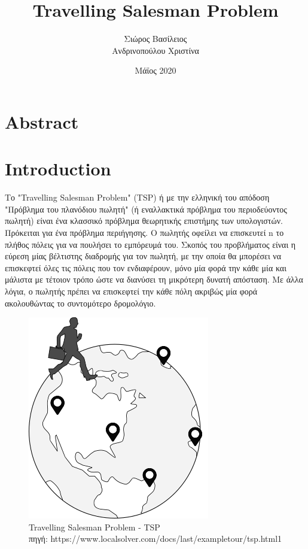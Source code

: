 \documentclass[oneside,12pt]{book}
\title{\huge Travelling Salesman Problem}
\author{Σιώρος Βασίλειος\\Ανδρινοπούλου Χριστίνα}
\date{Μάϊος 2020}
\newenvironment{matlab}
	{\begin{figure}[hp]\centering\captionsetup{justification=centering}}
	{\end{figure}}
\theoremstyle{definition}
\begin{document}
\maketitle
{}
\pagebreak
\tableofcontents

\chapter{Abstract}

\chapter{Introduction}

Το "Travelling Salesman Problem" (TSP) ή με την ελληνική του απόδοση "Πρόβλημα του πλανόδιου πωλητή" (ή εναλλακτικά πρόβλημα του περιοδεύοντος πωλητή) είναι ένα κλασσικό πρόβλημα θεωρητικής επιστήμης των  υπολογιστών. Πρόκειται για ένα πρόβλημα περιήγησης. Ο πωλητής οφείλει να επισκευτεί n το πλήθος πόλεις για να πουλήσει το εμπόρευμά του. Σκοπός του προβλήματος είναι η εύρεση μίας βέλτιστης διαδρομής για τον πωλητή, με την οποία θα μπορέσει να επισκεφτεί όλες τις πόλεις που τον ενδιαφέρουν, μόνο μία φορά την κάθε μία και μάλιστα με τέτοιον τρόπο ώστε να διανύσει τη μικρότερη δυνατή απόσταση. Με άλλα λόγια, ο πωλητής πρέπει να επισκεφτεί την κάθε πόλη ακριβώς μία φορά ακολουθώντας το συντομότερο δρομολόγιο. \\

\begin{matlab}
	\includegraphics[scale=0.8]{images/tsp.png}
	\caption{Travelling Salesman Problem - TSP \\ πηγή: https://www.localsolver.com/docs/last/exampletour/tsp.html1}
\end{matlab}
\end{document}
